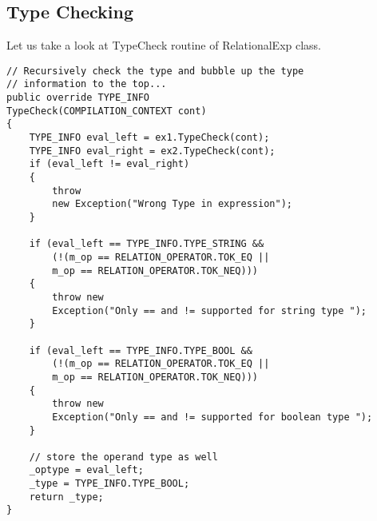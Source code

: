 \subsection{Type Checking}
Let us take a look at TypeCheck routine of RelationalExp class.
\lstset{style=csharp}
\begin{lstlisting}
// Recursively check the type and bubble up the type
// information to the top...
public override TYPE_INFO 
TypeCheck(COMPILATION_CONTEXT cont)
{
	TYPE_INFO eval_left = ex1.TypeCheck(cont);
	TYPE_INFO eval_right = ex2.TypeCheck(cont);
	if (eval_left != eval_right)
	{
		throw 
		new Exception("Wrong Type in expression");
	}
	
	if (eval_left == TYPE_INFO.TYPE_STRING &&
		(!(m_op == RELATION_OPERATOR.TOK_EQ ||
		m_op == RELATION_OPERATOR.TOK_NEQ)))
	{
		throw new 
		Exception("Only == and != supported for string type ");
	}

	if (eval_left == TYPE_INFO.TYPE_BOOL &&
		(!(m_op == RELATION_OPERATOR.TOK_EQ ||
		m_op == RELATION_OPERATOR.TOK_NEQ)))
	{
		throw new 
		Exception("Only == and != supported for boolean type ");
	}
 
	// store the operand type as well
	_optype = eval_left;
	_type = TYPE_INFO.TYPE_BOOL;
	return _type;
}
\end{lstlisting}
